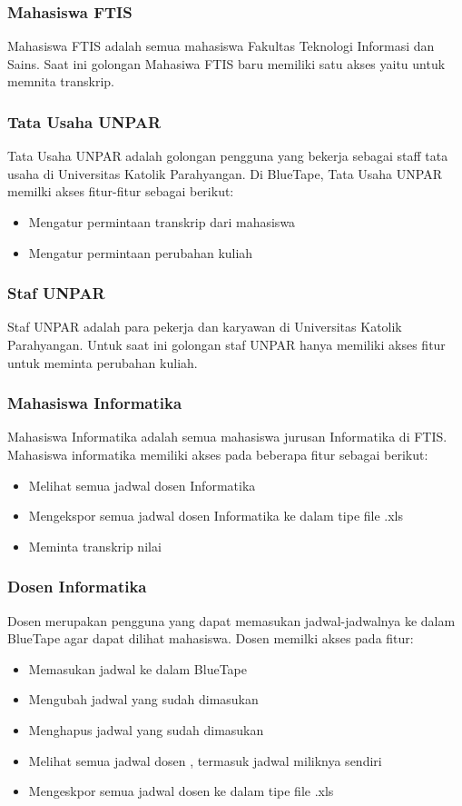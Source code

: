 \subsubsection{Mahasiswa FTIS}
Mahasiswa FTIS adalah semua mahasiswa Fakultas Teknologi Informasi dan Sains. Saat ini golongan Mahasiwa FTIS baru memiliki satu akses yaitu untuk memnita transkrip.


\subsubsection{Tata Usaha UNPAR}
Tata Usaha UNPAR adalah golongan pengguna yang bekerja sebagai staff tata usaha di Universitas Katolik Parahyangan. Di BlueTape, Tata Usaha UNPAR memilki akses fitur-fitur sebagai berikut:
\begin{itemize}
	\item Mengatur permintaan transkrip dari mahasiswa
	\item Mengatur permintaan perubahan kuliah 
\end{itemize}

\subsubsection{Staf UNPAR}
Staf UNPAR adalah para pekerja dan karyawan di Universitas Katolik Parahyangan. Untuk saat ini golongan staf UNPAR hanya memiliki akses fitur untuk meminta perubahan kuliah.

\subsubsection{Mahasiswa Informatika}
Mahasiswa Informatika adalah semua mahasiswa jurusan Informatika di FTIS. Mahasiswa informatika memiliki akses pada beberapa fitur sebagai berikut:
\begin{itemize}
	\item Melihat semua jadwal dosen Informatika
	\item Mengekspor semua jadwal dosen Informatika ke dalam tipe file .xls
	\item Meminta transkrip nilai
\end{itemize}

\subsubsection{Dosen Informatika}
Dosen merupakan pengguna yang dapat memasukan jadwal-jadwalnya ke dalam BlueTape agar dapat dilihat mahasiswa. Dosen memilki akses pada fitur:
\begin{itemize}
	\item Memasukan jadwal ke dalam BlueTape
	\item Mengubah jadwal yang sudah dimasukan  
	\item Menghapus jadwal yang sudah dimasukan
	\item Melihat semua jadwal dosen , termasuk jadwal miliknya sendiri
	\item Mengeskpor semua jadwal dosen ke dalam tipe file .xls
\end{itemize}